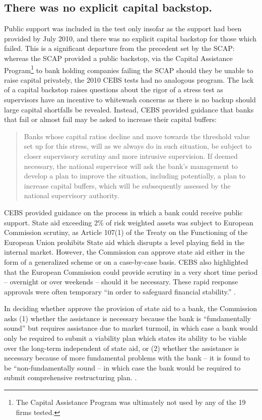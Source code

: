 \documentclass[12pt]{article}
\begin{document}
\subsection{There was no explicit capital backstop.}

Public support was included in the test only insofar as the support had been provided by July 2010, and there was no explicit capital backstop for those which failed. This is a significant departure from the precedent set by the SCAP: whereas the SCAP provided a public backstop, via the Capital Assistance Program\footnote{The Capital Assistance Program was ultimately not used by any of the 19 firms tested.} to bank holding companies failing the SCAP should they be unable to raise capital privately, the 2010 CEBS tests had no analogous program. The lack of a capital backstop raises questions about the rigor of a stress test as supervisors have an incentive to whitewash concerns as there is no backup should large capital shortfalls be revealed. Instead, CEBS provided guidance that banks that fail or almost fail may be asked to increase their capital buffers:

\begin{quote}
Banks whose capital ratios decline and move towards the threshold value set up for this stress, will as we always do in such situation, be subject to closer supervisory scrutiny and more intrusive supervision. If deemed necessary, the national supervisor will ask the bank’s management to develop a plan to improve the situation, including potentially, a plan to increase capital buffers, which will be subsequently assessed by the national supervisory authority.
\end{quote}

CEBS provided guidance on the process in which a bank could receive public support. State aid exceeding 2\% of risk weighted assets was subject to European Commission scrutiny, as Article 107(1) of the Treaty on the Functioning of the European Union prohibits State aid which disrupts a level playing field in the internal market. However, the Commission can approve state aid either in the form of a generalized scheme or on a case-by-case basis. CEBS also highlighted that the European Commission could provide scrutiny in a very short time period -- overnight or over weekends -- should it be necessary. These rapid response approvals were often temporary ``in order to safeguard financial stability.'' \citep{QA}.

In deciding whether approve the provision of state aid to a bank, the Commission asks (1) whether the assistance is necessary because the bank is ``fundamentally sound'' but requires assistance due to market turmoil, in which case a bank would only be required to submit a viability plan which states its ability to be viable over the long-term independent of state aid, or (2) whether the assistance is necessary because of more fundamental problems with the bank -- it is found to be ``non-fundamentally sound -- in which case the bank would be required to submit comprehensive restructuring plan. \citep{QA}.
\end{document}
